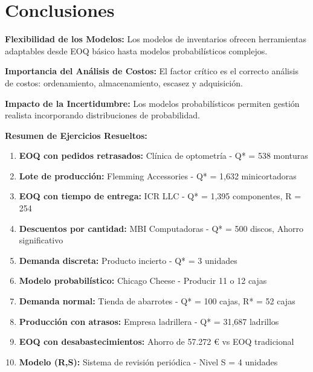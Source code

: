 \documentclass[12pt,a4paper]{book}
\begin{document}
	\section{Conclusiones}
	
	\begin{tcolorbox}[enhanced,colback=grisclaro,colframe=grisoScuro,boxrule=3pt,arc=15pt,
		drop shadow,title={\Large\bfseries\color{white} \faFlag\ SÍNTESIS DE APRENDIZAJES}]
		
		\textbf{Flexibilidad de los Modelos:} Los modelos de inventarios ofrecen herramientas adaptables desde EOQ básico hasta modelos probabilísticos complejos.
		
		\textbf{Importancia del Análisis de Costos:} El factor crítico es el correcto análisis de costos: ordenamiento, almacenamiento, escasez y adquisición.
		
		\textbf{Impacto de la Incertidumbre:} Los modelos probabilísticos permiten gestión realista incorporando distribuciones de probabilidad.
		
		\textbf{Resumen de Ejercicios Resueltos:}
		\begin{enumerate}[leftmargin=*,label=\textcolor{azulprincipal}{\arabic*.}]
			\item \textbf{EOQ con pedidos retrasados:} Clínica de optometría - Q* = 538 monturas
			\item \textbf{Lote de producción:} Flemming Accessories - Q* = 1,632 minicortadoras  
			\item \textbf{EOQ con tiempo de entrega:} ICR LLC - Q* = 1,395 componentes, R = 254
			\item \textbf{Descuentos por cantidad:} MBI Computadoras - Q* = 500 discos, Ahorro significativo
			\item \textbf{Demanda discreta:} Producto incierto - Q* = 3 unidades
			\item \textbf{Modelo probabilístico:} Chicago Cheese - Producir 11 o 12 cajas
			\item \textbf{Demanda normal:} Tienda de abarrotes - Q* = 100 cajas, R* = 52 cajas
			\item \textbf{Producción con atrasos:} Empresa ladrillera - Q* = 31,687 ladrillos
			\item \textbf{EOQ con desabastecimientos:} Ahorro de 57.272 € vs EOQ tradicional
			\item \textbf{Modelo (R,S):} Sistema de revisión periódica - Nivel S = 4 unidades
		\end{enumerate}
		
	\end{tcolorbox}
	
\end{document}
